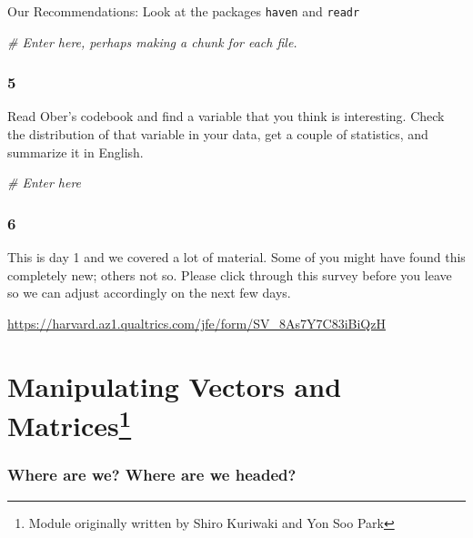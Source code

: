 \documentclass[]{book}
\newenvironment{Shaded}{\begin{snugshade}}{\end{snugshade}}
\newcommand{\CommentTok}[1]{\textcolor[rgb]{0.56,0.35,0.01}{\textit{#1}}}
\let\rmarkdownfootnote\footnote%
\def\footnote{\protect\rmarkdownfootnote}
\theoremstyle{definition}
\theoremstyle{definition}
\theoremstyle{definition}
\theoremstyle{remark}
\begin{document}
Our Recommendations: Look at the packages \texttt{haven} and \texttt{readr}

\begin{Shaded}
\begin{Highlighting}[]
\CommentTok{# Enter here, perhaps making a chunk for each file.}
\end{Highlighting}
\end{Shaded}

\hypertarget{section-4}{%
\subsection*{5}\label{section-4}}

Read Ober's codebook and find a variable that you think is interesting. Check the distribution of that variable in your data, get a couple of statistics, and summarize it in English.

\begin{Shaded}
\begin{Highlighting}[]
\CommentTok{# Enter here}
\end{Highlighting}
\end{Shaded}

\hypertarget{section-5}{%
\subsection*{6}\label{section-5}}

This is day 1 and we covered a lot of material. Some of you might have found this completely new; others not so. Please click through this survey before you leave so we can adjust accordingly on the next few days.

\url{https://harvard.az1.qualtrics.com/jfe/form/SV_8As7Y7C83iBiQzH}

\hypertarget{rmatrices}{%
\chapter[Manipulating Vectors and Matrices]{\texorpdfstring{Manipulating Vectors and Matrices\footnote{Module originally written by Shiro Kuriwaki and Yon Soo Park}}{Manipulating Vectors and Matrices}}\label{rmatrices}}

\hypertarget{where-are-we-where-are-we-headed-1}{%
\subsection*{Where are we? Where are we headed?}\label{where-are-we-where-are-we-headed-1}}
\end{document}
